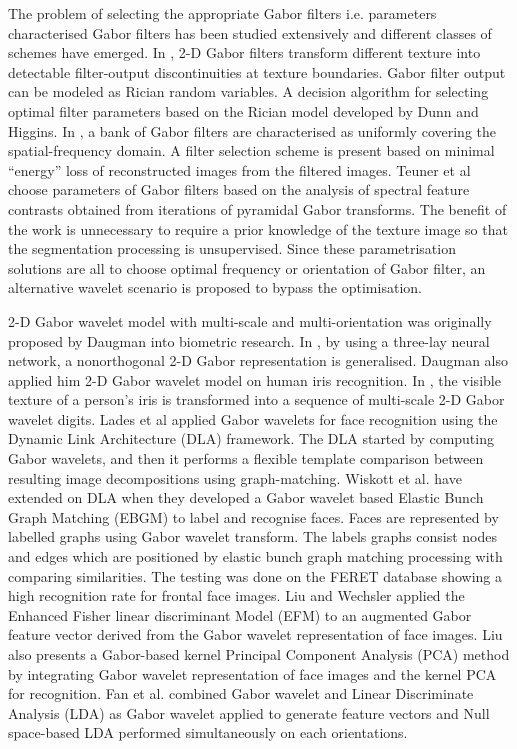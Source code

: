 The problem of selecting the appropriate Gabor filters i.e. parameters characterised Gabor filters has been studied extensively and different classes of schemes have emerged. In \cite{Dunn1994}, 2-D Gabor filters transform different texture into detectable filter-output discontinuities at texture boundaries. Gabor filter output can be modeled as Rician random variables. A decision algorithm for selecting optimal filter parameters based on the Rician model developed by Dunn and Higgins\cite{Dunn1995}. In \cite{Jain1991}, a bank of Gabor filters are characterised as uniformly covering the spatial-frequency domain. A filter selection scheme is present based on minimal ``energy'' loss of reconstructed images from the filtered images. Teuner et al\cite{} choose parameters of Gabor filters based on the analysis of spectral feature contrasts obtained from iterations of pyramidal Gabor transforms. The benefit of the work is unnecessary to require a prior knowledge of the texture image so that the segmentation processing is unsupervised. Since these parametrisation solutions are all to choose optimal frequency or orientation of Gabor filter, an alternative wavelet scenario is proposed to bypass the optimisation. 

2-D Gabor wavelet model with multi-scale and multi-orientation was originally proposed by Daugman\cite{Daugman1985, Daugman1988} into biometric research. In \cite{Daugman1988}, by using a three-lay neural network, a nonorthogonal 2-D Gabor representation is generalised. Daugman also applied him 2-D Gabor wavelet model on human iris recognition.  In \cite{Daugman1993}, the visible texture of a person's iris is transformed into a sequence of multi-scale 2-D Gabor wavelet digits. Lades et al\cite{Lades1993} applied Gabor wavelets for face recognition using the Dynamic Link Architecture (DLA) framework. The DLA started by computing Gabor wavelets, and then it performs a flexible template comparison between resulting image decompositions using graph-matching. Wiskott et al.\cite{Wiskott1997,Wiskott1999} have extended on DLA when they developed a Gabor wavelet based Elastic Bunch Graph Matching (EBGM) to label and recognise faces. Faces are represented by labelled graphs using Gabor wavelet transform. The labels graphs consist nodes and edges which are positioned by elastic bunch graph matching processing with comparing similarities. The testing was done on the FERET database\cite{Phillips2000} showing a high recognition rate for frontal face images. Liu and Wechsler\cite{Liu2002} applied the Enhanced Fisher linear discriminant Model (EFM) to an augmented Gabor feature vector derived from the Gabor wavelet representation of face images. Liu\cite{Liu2004} also presents a Gabor-based kernel Principal Component Analysis (PCA) method by integrating Gabor wavelet representation of face images and the kernel PCA for recognition.  Fan et al.\cite{Fan2004} combined Gabor wavelet and Linear Discriminate Analysis (LDA) as Gabor wavelet applied to generate feature vectors and Null space-based LDA performed simultaneously on each orientations. 

